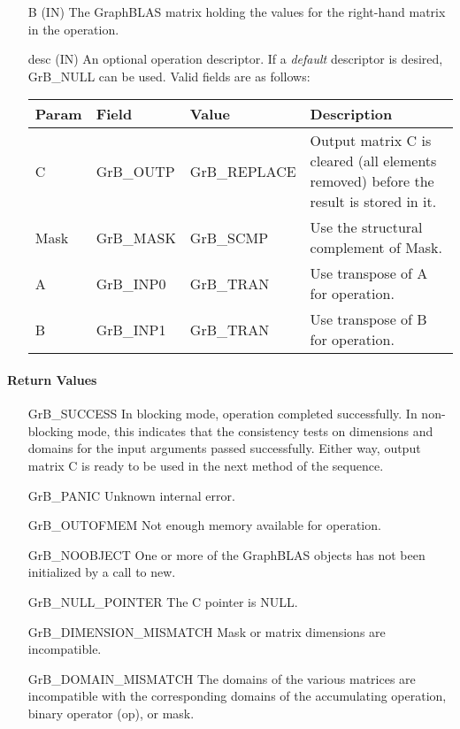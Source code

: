 \begin{itemize}[leftmargin=1.1in]
    \item[{\sf B}]     ({\sf IN}) The GraphBLAS matrix holding the values for
    the right-hand matrix in the operation.
    
    \item[{\sf desc}]  ({\sf IN}) An optional operation descriptor.  If a \emph{default}
    descriptor is desired, {\sf GrB\_NULL} can be used.  Valid fields are
    as follows: \\
    
    \begin{tabular}{lllp{2.5in}}
        Param & Field  & Value & Description \\
        \hline
        {\sf C}    & {\sf GrB\_OUTP} & {\sf GrB\_REPLACE} & Output matrix {\sf C} is cleared (all elements removed) before the result is stored in it.  \\
        {\sf Mask} & {\sf GrB\_MASK} & {\sf GrB\_SCMP}   & Use the structural complement of {\sf Mask}. \\
        {\sf A}    & {\sf GrB\_INP0} & {\sf GrB\_TRAN}   & Use transpose of {\sf A} for operation. \\
        {\sf B}    & {\sf GrB\_INP1} & {\sf GrB\_TRAN}   & Use transpose of {\sf B} for operation. \\
    \end{tabular}
\end{itemize}

\paragraph{Return Values}

\begin{itemize}[leftmargin=2.1in]
    \item[{\sf GrB\_SUCCESS}]         In blocking mode, operation
	completed successfully. In non-blocking mode, this indicates
	that the consistency tests on dimensions and domains for the
	input arguments passed successfully. Either way, output matrix
	{\sf C} is ready to be used in the next method of the sequence.

    \item[{\sf GrB\_PANIC}]           Unknown internal error.
    
    \item[{\sf GrB\_OUTOFMEM}]        Not enough memory available for operation.
    
    \item[{\sf GrB\_NOOBJECT}]        One or more of the GraphBLAS objects has
    not been initialized by a call to {\sf new}.
    
    \item[{\sf GrB\_NULL\_POINTER}]  The {\sf C} pointer is {\sf NULL}.

    \item[{\sf GrB\_DIMENSION\_MISMATCH}] Mask or matrix dimensions are incompatible.

	\item[{\sf GrB\_DOMAIN\_MISMATCH}]    The domains of the various
	matrices are incompatible with the corresponding domains of the
	accumulating operation, binary operator ({\sf op}), or mask.
\end{itemize}

